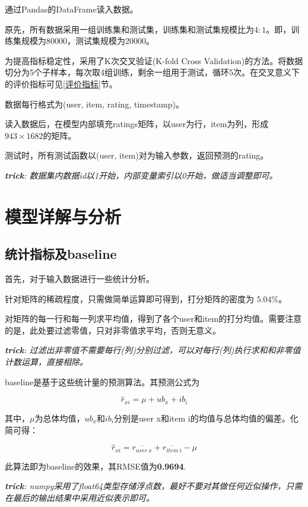 \documentclass[utf8, a4paper,12pt, onecolumn]{ctexart}
\begin{document}
\begin{spacing}{1.3}
通过Pandas的DataFrame读入数据。

原先，所有数据采用一组训练集和测试集，训练集和测试集规模比为$4:1$。即，训练集规模为80000，测试集规模为20000。

为提高指标稳定性，采用了K次交叉验证(K-fold Cross Validation)的方法。将数据切分为5个子样本，每次取4组训练，剩余一组用于测试，循环5次。在交叉意义下的评价指标可见\ref{评价指标}节。

数据每行格式为(user, item, rating, timestamp)。

读入数据后，在模型内部填充ratings矩阵，以user为行，item为列，形成$943 \times 1682$的矩阵。

测试时，所有测试函数以(user, item)对为输入参数，返回预测的rating。

\textit{\textbf{trick}: 数据集内数据id以1开始，内部变量索引以0开始，做适当调整即可。}
\section{模型详解与分析}
\label{模型详解}
\subsection{统计指标及baseline}

首先，对于输入数据进行一些统计分析。

针对矩阵的稀疏程度，只需做简单运算即可得到，打分矩阵的密度为 $5.04\%$。

对矩阵的每一行和每一列求平均值，得到了各个user和item的打分均值。需要注意的是，此处要过滤零值，只对非零值求平均，否则无意义。

\textit{\textbf{trick}: 过滤出非零值不需要每行(列)分别过滤，可以对每行(列)执行求和和非零值计数运算，直接相除。}

baseline是基于这些统计量的预测算法。其预测公式为

\[\hat{r}_{xi} = \mu + ub_{x} + ib_{i}\]

其中，$\mu$为总体均值，$ub_{x}$和$ib_{i}$分别是user x和item i的均值与总体均值的偏差。化简可得：

\[\hat{r}_{xi} = \overline{r_{user\ x}}+ \overline{r_{item\ i}} - \mu\]

此算法即为baseline的效果，其RMSE值为\textbf{0.9694}.

\textit{\textbf{trick}: numpy采用了float64类型存储浮点数，最好不要对其做任何近似操作，只需在最后的输出结果中采用近似表示即可。}



\end{spacing}
\end{document}
